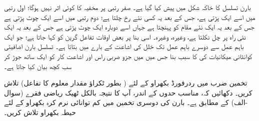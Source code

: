 بارن تسلسل کا خاکہ شکل   میں پیش کیا گیا ہے۔ صفر رتبی  پر مخفیہ کا کوئی اثر نہیں ہوگا؛  اول رتبی  میں اسے ایک    پڑتی ہے،  جس کے بعد یہ کسی نئے رخ چلتا ہے؛  دوم رتبی میں اسے ایک چوٹ پڑتی ہے جس کے بعد یہ ایک نئے مقام کو  پہنچتا ہے جہاں اسے دوبارہ ایک چوٹ پڑتی ہے جس کے بعد یہ ایک نئی  راہ پر چل نکلتا ہے،  وغیرہ،  وغیرہ۔ اسی  بنا پر بعض اوقات تفاعل گرین کو  کہا جاتا ہے؛  جو ایک باہم عمل  سے  دوسرے باہم عمل  تک خلل کی اشاعت کے بارے میں بتاتا ہے۔  تسلسل بارن اضافیتی کوانٹائی میکانیات کی  کا سبب بنا جس میں   میں جزو ضربی راس  اور اشاعت کار  کو ایک   ساتھ جوڑ کر سب کچھ بیان کیا جاتا ہے۔

تخمین ضرب میں ردرفورڈ بکھراو کے لئے  ( بطور ٹکراؤ مقدار معلوم کا تفاعل)  تلاش کریں۔ دکھائیں کہ، مناسب حدوں کے اندر،  آپ کا نتیجہ بالکل  ٹھیک ریاضی فقرے   (سوال -الف)   کے مطابق ہے۔
بارن کی دوسری تخمین میں کم توانائی نرم کرہ بکھراو کے لئے حیطہ بکھراو تلاش کریں۔

